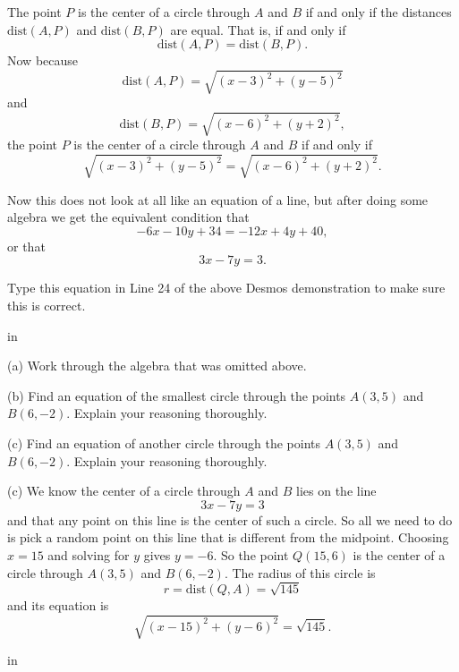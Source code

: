 \documentclass{ximera}
\newcommand{\pskip}{\vskip 0.1 in}
\begin{document}
\begin{example}
\begin{explanation}
The point $P$ is the center of a circle through $A$ and $B$ if and only if the distances $\text{dist}(A,P)$ and $\text{dist}(B,P)$ are equal. That is, if and only if
\[
   \text{dist}(A,P)  = \text{dist}(B,P) .
\]
Now because
\[
   \text{dist}(A,P) = \sqrt{(x-3)^2 + (y-5)^2}
\] 
and
\[
  \text{dist}(B,P) = \sqrt{(x-6)^2 + (y+2)^2} ,
\]
the point $P$ is the center of a circle through $A$ and $B$ if and only if
\[
   \sqrt{(x-3)^2 + (y-5)^2} = \sqrt{(x-6)^2 + (y+2)^2} .
\]

Now this does not look at all like an equation of a line, but after doing some algebra we get the equivalent condition that
\[
      -6x -10y + 34 = -12x + 4y +40 ,
\] 
or that 
\[
    3x - 7y = 3 .
\]
 
Type this equation in Line 24 of the above Desmos demonstration to make sure this is correct.

\end{explanation}

\pskip

\begin{question} \label{Q1}
(a) Work through the algebra that was omitted above.

(b) Find an equation of the smallest circle through the points $A(3,5)$ and $B(6,-2)$. Explain your reasoning thoroughly.

(c) Find an equation of another circle through the points $A(3,5)$ and $B(6,-2)$. Explain your reasoning thoroughly.

\begin{explanation}
(c) We know the center of a circle through $A$ and $B$ lies on the line 
\[
    3x - 7y = 3
\]
and that any point on this line is the center of such a circle. So all we need to do is pick a random point on this line that is different from the midpoint. Choosing $x=15$ and solving for $y$ gives $y=-6$. So the point $Q(15,6)$ is the center of a circle through $A(3,5)$ and $B(6,-2)$. The radius of this circle is
\[
  r  =\text{dist}(Q,A) = \sqrt{145}  
\]
and its equation is
\[
   \sqrt{(x-15)^2 + (y-6)^2} = \sqrt{145} .
\]
\end{explanation}

\end{question}

\end{example}

\pskip
\end{document}
